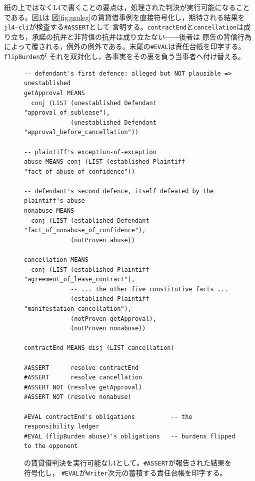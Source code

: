 \documentclass[11pt,a4paper]{ltjsarticle}
\newcommand{\code}[1]{\texttt{\small #1}}
\begin{document}
紙の上ではなくL4で書くことの要点は，処理された判決が実行可能になることである。図\ref{fig:burdenlease}は
図\ref{fig:proleg}の賃貸借事例を直接符号化し，期待される結果を\code{jl4-cli}が検査する\code{\#ASSERT}として
言明する。\code{contractEnd}と\code{cancellation}は成り立ち，承諾の抗弁と非背信の抗弁は成り立たない――後者は
原告の背信行為によって覆される，例外の例外である。末尾の\code{\#EVAL}は責任台帳を印字する。\code{flipBurden}が
それを双対化し，各事実をその裏を負う当事者へ付け替える。

\begin{figure}[t]
\begin{lstlisting}
-- defendant's first defence: alleged but NOT plausible => unestablished
getApproval MEANS
  conj (LIST (unestablished Defendant "approval_of_sublease"),
             (unestablished Defendant "approval_before_cancellation"))

-- plaintiff's exception-of-exception
abuse MEANS conj (LIST (established Plaintiff "fact_of_abuse_of_confidence"))

-- defendant's second defence, itself defeated by the plaintiff's abuse
nonabuse MEANS
  conj (LIST (established Defendant "fact_of_nonabuse_of_confidence"),
             (notProven abuse))

cancellation MEANS
  conj (LIST (established Plaintiff "agreement_of_lease_contract"),
             -- ... the other five constitutive facts ...
             (established Plaintiff "manifestation_cancellation"),
             (notProven getApproval),
             (notProven nonabuse))

contractEnd MEANS disj (LIST cancellation)

#ASSERT      resolve contractEnd
#ASSERT      resolve cancellation
#ASSERT NOT (resolve getApproval)
#ASSERT NOT (resolve nonabuse)

#EVAL contractEnd's obligations          -- the responsibility ledger
#EVAL (flipBurden abuse)'s obligations   -- burdens flipped to the opponent
\end{lstlisting}
\caption{\cite{satoh2011proleg}の賃貸借判決を実行可能なL4として。\code{\#ASSERT}が報告された結果を符号化し，
\code{\#EVAL}が\code{Writer}次元の蓄積する責任台帳を印字する。}
\label{fig:burdenlease}
\end{figure}
\end{document}
